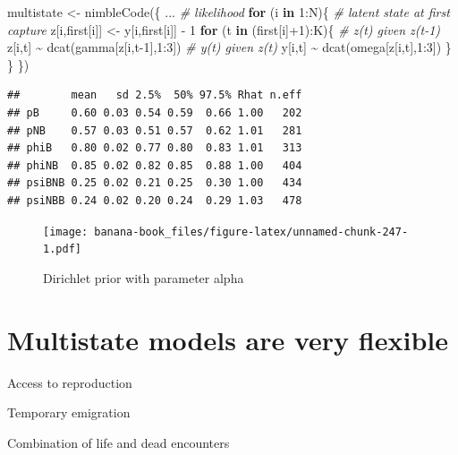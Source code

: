 \documentclass[
  12pt,
]{krantz}
\newenvironment{Shaded}{\begin{snugshade}}{\end{snugshade}}
\newcommand{\CommentTok}[1]{\textcolor[rgb]{0.56,0.35,0.01}{\textit{#1}}}
\newcommand{\ControlFlowTok}[1]{\textcolor[rgb]{0.13,0.29,0.53}{\textbf{#1}}}
\newcommand{\DecValTok}[1]{\textcolor[rgb]{0.00,0.00,0.81}{#1}}
\newcommand{\FunctionTok}[1]{\textcolor[rgb]{0.00,0.00,0.00}{#1}}
\newcommand{\NormalTok}[1]{#1}
\newcommand{\OtherTok}[1]{\textcolor[rgb]{0.56,0.35,0.01}{#1}}
\newcommand{\SpecialCharTok}[1]{\textcolor[rgb]{0.00,0.00,0.00}{#1}}
\begin{document}
\begin{Shaded}
\begin{Highlighting}[]
\NormalTok{multistate }\OtherTok{\textless{}{-}} \FunctionTok{nimbleCode}\NormalTok{(\{}
\NormalTok{...}
  \CommentTok{\# likelihood}
  \ControlFlowTok{for}\NormalTok{ (i }\ControlFlowTok{in} \DecValTok{1}\SpecialCharTok{:}\NormalTok{N)\{}
    \CommentTok{\# latent state at first capture}
\NormalTok{    z[i,first[i]] }\OtherTok{\textless{}{-}}\NormalTok{ y[i,first[i]] }\SpecialCharTok{{-}} \DecValTok{1}
    \ControlFlowTok{for}\NormalTok{ (t }\ControlFlowTok{in}\NormalTok{ (first[i]}\SpecialCharTok{+}\DecValTok{1}\NormalTok{)}\SpecialCharTok{:}\NormalTok{K)\{}
      \CommentTok{\# z(t) given z(t{-}1)}
\NormalTok{      z[i,t] }\SpecialCharTok{\textasciitilde{}} \FunctionTok{dcat}\NormalTok{(gamma[z[i,t}\DecValTok{{-}1}\NormalTok{],}\DecValTok{1}\SpecialCharTok{:}\DecValTok{3}\NormalTok{])}
      \CommentTok{\# y(t) given z(t)}
\NormalTok{      y[i,t] }\SpecialCharTok{\textasciitilde{}} \FunctionTok{dcat}\NormalTok{(omega[z[i,t],}\DecValTok{1}\SpecialCharTok{:}\DecValTok{3}\NormalTok{])}
\NormalTok{    \}}
\NormalTok{  \}}
\NormalTok{\})}
\end{Highlighting}
\end{Shaded}

\begin{verbatim}
##        mean   sd 2.5%  50% 97.5% Rhat n.eff
## pB     0.60 0.03 0.54 0.59  0.66 1.00   202
## pNB    0.57 0.03 0.51 0.57  0.62 1.01   281
## phiB   0.80 0.02 0.77 0.80  0.83 1.01   313
## phiNB  0.85 0.02 0.82 0.85  0.88 1.00   404
## psiBNB 0.25 0.02 0.21 0.25  0.30 1.00   434
## psiNBB 0.24 0.02 0.20 0.24  0.29 1.03   478
\end{verbatim}

\begin{figure}
\centering
\texttt{[image: banana-book\_files/figure-latex/unnamed-chunk-247-1.pdf]}
\caption{\label{fig:unnamed-chunk-247}Dirichlet prior with parameter alpha}
\end{figure}

\hypertarget{multistate-models-are-very-flexible}{%
\section{Multistate models are very flexible}\label{multistate-models-are-very-flexible}}

Access to reproduction

Temporary emigration

Combination of life and dead encounters
\end{document}
